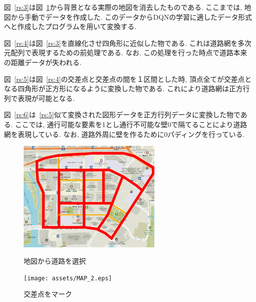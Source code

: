 図~\ref{rs:3}は図~\ref{rs:2}から背景となる実際の地図を消去したものである. ここまでは, 地図から手動でデータを作成した. このデータからDQNの学習に適したデータ形式へと作成したプログラムを用いて変換する.

図~\ref{rs:4}は図~\ref{rs:3}を直線化させ四角形に近似した物である. これは道路網を多次元配列で表現するための前処理である. なお, この処理を行った時点で道路本来の距離データが失われる.

図~\ref{rs:5}は図~\ref{rs:4}の交差点と交差点の間を１区間とした時, 頂点全てが交差点となる四角形が正方形になるように変換した物である. これにより道路網は正方行列で表現が可能となる.

図~\ref{rs:6}は~\ref{rs:5}似て変換された図形データを正方行列データに変換した物である. ここでは, 通行可能な要素を1とし通行不可能な壁0で隔てることにより道路網を表現している.
なお, 道路外周に壁を作るために0パディングを行っている.

\begin{figure}[htbp]
    \begin{minipage}{0.5\hsize}
        \begin{center}
            \includegraphics[width=70mm]{assets/MAP_1.eps}
        \end{center}
        \caption{地図から道路を選択}
        \label{rs:1}
    \end{minipage}
    \begin{minipage}{0.5\hsize}
        \begin{center}
            \texttt{[image: assets/MAP\_2.eps]}
        \end{center}
        \caption{交差点をマーク}
        \label{rs:2}
    \end{minipage}
\end{figure}



